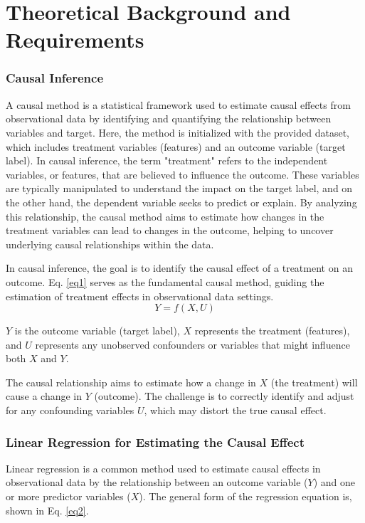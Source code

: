\chapter{Theoretical Background and Requirements}\label{background}

\subsection{Causal Inference}
A causal method is a statistical framework \cite{zhao2023causal, naser2023causality} used to estimate causal effects from observational data by identifying and quantifying the relationship between variables and target. Here, the method is initialized with the provided dataset, which includes treatment variables (features) and an outcome variable (target label). In causal inference, the term "treatment" refers to the independent variables, or features, that are believed to influence the outcome. These variables are typically manipulated to understand the impact on the target label, and on the other hand, the dependent variable seeks to predict or explain. By analyzing this relationship, the causal method aims to estimate how changes in the treatment variables can lead to changes in the outcome, helping to uncover underlying causal relationships within the data.

In causal inference, the goal is to identify the causal effect of a treatment on an outcome. Eq. \ref{eq1} serves as the fundamental causal method, guiding the estimation of treatment effects in observational data settings.
\begin{equation}\label{eq1}
Y = f(X, U)
\end{equation}


$Y$ is the outcome variable (target label), $X$ represents the treatment (features), and $U$ represents any unobserved confounders or variables that might influence both $X$ and $Y$.

The causal relationship aims to estimate how a change in $X$ (the treatment) will cause a change in $Y$ (outcome). The challenge is to correctly identify and adjust for any confounding variables $U$, which may distort the true causal effect. 


\subsection{Linear Regression for Estimating the Causal Effect}

Linear regression is a common method used to estimate causal effects \cite{wang2015visual} in observational data by the relationship between an outcome variable (\(Y\)) and one or more predictor variables (\(X\)). The general form of the regression equation is, shown in Eq. \ref{eq2}.

